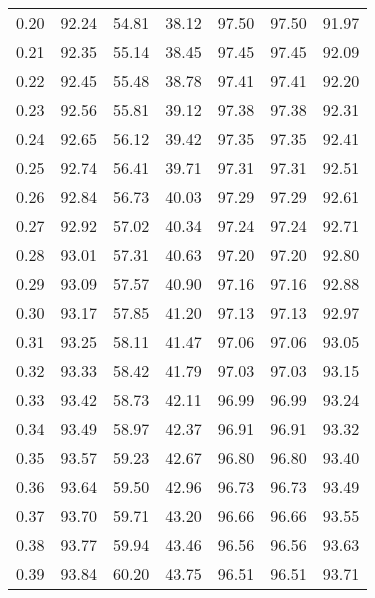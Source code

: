 \begin{tabular}{|c|c|c|c|c|c|c|}
      0.20 &     92.24 &     54.81 &      38.12 &   97.50 &      97.50 &         91.97 \\
      0.21 &     92.35 &     55.14 &      38.45 &   97.45 &      97.45 &         92.09 \\
      0.22 &     92.45 &     55.48 &      38.78 &   97.41 &      97.41 &         92.20 \\
      0.23 &     92.56 &     55.81 &      39.12 &   97.38 &      97.38 &         92.31 \\
      0.24 &     92.65 &     56.12 &      39.42 &   97.35 &      97.35 &         92.41 \\
      0.25 &     92.74 &     56.41 &      39.71 &   97.31 &      97.31 &         92.51 \\
      0.26 &     92.84 &     56.73 &      40.03 &   97.29 &      97.29 &         92.61 \\
      0.27 &     92.92 &     57.02 &      40.34 &   97.24 &      97.24 &         92.71 \\
      0.28 &     93.01 &     57.31 &      40.63 &   97.20 &      97.20 &         92.80 \\
      0.29 &     93.09 &     57.57 &      40.90 &   97.16 &      97.16 &         92.88 \\
      0.30 &     93.17 &     57.85 &      41.20 &   97.13 &      97.13 &         92.97 \\
      0.31 &     93.25 &     58.11 &      41.47 &   97.06 &      97.06 &         93.05 \\
      0.32 &     93.33 &     58.42 &      41.79 &   97.03 &      97.03 &         93.15 \\
      0.33 &     93.42 &     58.73 &      42.11 &   96.99 &      96.99 &         93.24 \\
      0.34 &     93.49 &     58.97 &      42.37 &   96.91 &      96.91 &         93.32 \\
      0.35 &     93.57 &     59.23 &      42.67 &   96.80 &      96.80 &         93.40 \\
      0.36 &     93.64 &     59.50 &      42.96 &   96.73 &      96.73 &         93.49 \\
      0.37 &     93.70 &     59.71 &      43.20 &   96.66 &      96.66 &         93.55 \\
      0.38 &     93.77 &     59.94 &      43.46 &   96.56 &      96.56 &         93.63 \\
      0.39 &     93.84 &     60.20 &      43.75 &   96.51 &      96.51 &         93.71 \\

\end{tabular}
